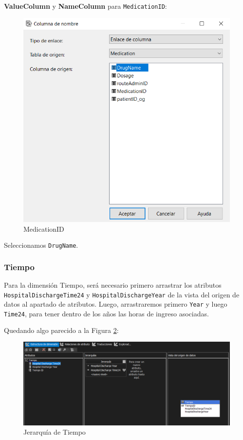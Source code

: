\documentclass[12pt, a4paper, twoside]{article}
\begin{document}
\textbf{ValueColumn} y \textbf{NameColumn} para \texttt{MedicationID}:

\begin{figure}[H]
	\centering
	\includegraphics[width=1\textwidth]{image/MedicationID}
	\caption{MedicationID}
	\label{fig:24}
\end{figure}

Seleccionamos \texttt{DrugName}.

\subsubsection{Tiempo}

Para la dimensión Tiempo, será necesario primero arrastrar los atributos \texttt{HospitalDischargeTime24} y \texttt{HospitalDischargeYear} de la vista del origen de datos al apartado de atributos. Luego, arrastraremos primero \texttt{Year} y luego \texttt{Time24}, para tener dentro de los años las horas de ingreso asociadas.

Quedando algo parecido a la Figura \ref{fig:28}:

\begin{figure}[H]
	\centering
	\includegraphics[width=1\textwidth]{image/JTiempo}
	\caption{Jerarquía de Tiempo}
	\label{fig:28}
\end{figure}
\end{document}
